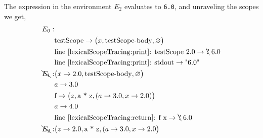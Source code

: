 \documentclass[fsharpnotes.tex]{subfiles}
\begin{document}
The expression in the environment $E_2$ evaluates to \lstinline!6.0!, and unraveling the scopes we get,
\begin{align*}
  E_0:&\\
      &\text{testScope} \rightarrow \big(x, \text{testScope-body}, \varnothing\big)\\
      & \text{line~\ref{lexicalScopeTracing:print}: testScope 2.0} \rightarrow \bcancel{\text{?}}\; 6.0\\
      & \text{line~\ref{lexicalScopeTracing:print}: stdout} \rightarrow \text{"6.0"}\\
  \bcancel{E_1}: & \big(x\rightarrow 2.0, \text{testScope-body}, \varnothing\big)\\
      & a \rightarrow 3.0\\
      & \text{f} \rightarrow \big(z, \text{a * z}, (a \rightarrow 3.0, x\rightarrow 2.0)\big)\\
      & a \rightarrow 4.0 \\
      & \text{line~\ref{lexicalScopeTracing:return}: f x} \rightarrow \bcancel{\text{?}}\; 6.0\\
  \bcancel{E_2}: & \big(z \rightarrow 2.0, \text{a * z}, (a \rightarrow 3.0, x\rightarrow 2.0\big)\\
\end{align*}
\end{document}
